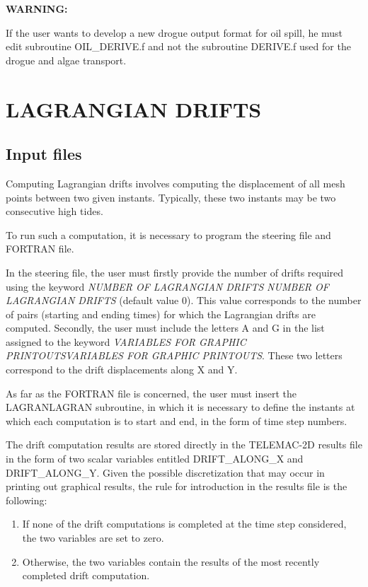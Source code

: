  \textbf{WARNING:}

 If the user wants to develop a new drogue output format for oil spill, he must edit subroutine OIL\_DERIVE.f and not the subroutine DERIVE.f used for the drogue and algae transport.


\section{ LAGRANGIAN DRIFTS}


\subsection{ Input files}

 Computing Lagrangian drifts involves computing the displacement of all mesh points between two given instants. Typically, these two instants may be two consecutive high tides.

 To run such a computation, it is necessary to program the steering file and FORTRAN file.

 In the steering file, the user must firstly provide the number of drifts required using the keyword \textit{NUMBER OF LAGRANGIAN DRIFTS} \textit{NUMBER OF LAGRANGIAN DRIFTS} (default value 0). This value corresponds to the number of pairs (starting and ending times) for which the Lagrangian drifts are computed. Secondly, the user must include the letters A and G in the list assigned to the keyword \textit{VARIABLES FOR GRAPHIC PRINTOUTSVARIABLES FOR GRAPHIC PRINTOUTS}. These two letters correspond to the drift displacements along X and Y.

 As far as the FORTRAN file is concerned, the user must insert the LAGRANLAGRAN subroutine, in which it is necessary to define the instants at which each computation is to start and end, in the form of time step numbers.

 The drift computation results are stored directly in the TELEMAC-2D results file in the form of two scalar variables entitled DRIFT\_ALONG\_X and DRIFT\_ALONG\_Y. Given the possible discretization that may occur in printing out graphical results, the rule for introduction in the results file is the following:

\begin{enumerate}
\item  If none of the drift computations is completed at the time step considered, the two variables are set to zero.

\item  Otherwise, the two variables contain the results of the most recently completed drift computation.
\end{enumerate}

